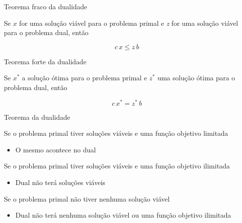 \documentclass[compress,mathserif]{beamer}
\begin{document}
\begin{frame}{Teorema fraco da dualidade}

Se $x$ for uma solução viável para o problema primal e \textit{z} for uma solução viável para o problema dual, então

$$
c\,x \leq z\,b
$$
\end{frame}


\begin{frame}{Teorema forte da dualidade}

Se $x^*$ a solução ótima para o problema primal e $z^*$ uma solução ótima para o problema dual, então

$$
c\,x^* = z^*\,b
$$

\end{frame}


\begin{frame}{Teorema da dualidade}

Se o problema primal tiver soluções viáveis e uma função objetivo limitada
\begin{itemize}
    \item O mesmo acontece no dual
\end{itemize}

\vspace{0.5cm}

Se o problema primal tiver soluções viáveis e uma função objetivo ilimitada
\begin{itemize}
    \item Dual não terá soluções viáveis
\end{itemize}

\vspace{0.5cm}

Se o problema primal não tiver nenhuma solução viável
\begin{itemize}
    \item Dual não terá nenhuma solução viável ou uma função objetivo ilimitada
\end{itemize}
\end{frame}
\end{document}

